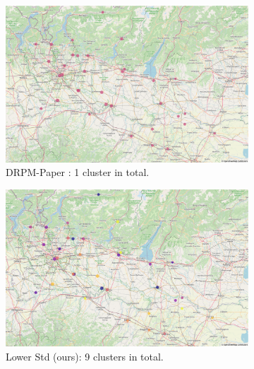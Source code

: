 \documentclass[12pt,a4paper]{article}
\begin{document}
\begin{figure}
     \centering
     \begin{subfigure}[b]{0.49\textwidth}
         \centering
         \includegraphics[width=\textwidth]{./imgs/drpm/drpm_base_clustering_paper_params.png}
         \caption{DRPM-Paper \cite{Page2021-Temporal}: 1 cluster in total.}
         \label{fig:DRPMclusteringPaper}
     \end{subfigure}
     \hfill
     \begin{subfigure}[b]{0.49\textwidth}
         \centering
         \includegraphics[width=\textwidth]{./imgs/drpm/drpm_base_clustering_lower_std.png}
         \caption{Lower Std (ours): 9 clusters in total.}
         \label{fig:DRPMClusteringLowerStd}
     \end{subfigure}
     \hfill
     \begin{subfigure}[b]{0.49\textwidth}
         \centering

\end{subfigure}
\end{figure}
\end{document}
